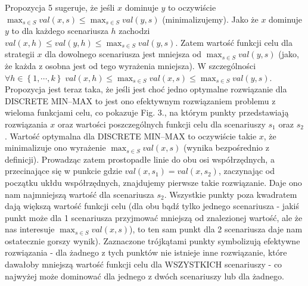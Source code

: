 Propozycja 5 sugeruje, że jeśli $x$ dominuje $y$ to oczywiście $\max_{s \in S} val \left( x, s \right) \leqslant \max_{s \in S} val \left( y, s \right)$ (minimalizujemy). Jako że $x$ dominuje $y$ to dla każdego scenariusza $h$ zachodzi $val \left( x, h \right) \leqslant val \left( y, h \right) \leqslant \max_{s \in S} val \left( y, s \right)$. Zatem wartość funkcji celu dla strategii $x$ dla dowolnego scenariusza jest mniejsza od $\max_{s \in S} val \left( y, s \right)$ (jako, że każda z osobna jest od tego wyrażenia mniejsza). W szczególności $\forall h \in \left\{ 1, \cdots, k \right\} \; val \left( x, h \right) \leqslant \max_{s \in S} val \left( x, s \right) \leqslant \max_{s \in S} val \left( y, s \right)$. Propozycja jest teraz taka, że jeśli jest choć jedno optymalne rozwiązanie dla DISCRETE MIN–MAX to jest ono efektywnym rozwiązaniem problemu z wieloma funkcjami celu, co pokazuje Fig. 3., na którym punkty przedstawiają rozwiązania $x$ oraz wartości poszczególnych funkcji celu dla scenariuszy $s_{1}$ oraz $s_{2}$. Wartość optymalna dla DISCRETE MIN–MAX to oczywiście takie $x$, że minimalizuje ono wyrażenie $\max_{s \in S} val \left( x, s \right)$ (wynika bezpośrednio z definicji). Prowadząc zatem prostopadłe linie do obu osi współrzędnych, a przecinające się w punkcie gdzie $val \left( x, s_{1} \right) = val \left( x, s_{2} \right)$, zaczynając od początku ukłdu współrzędnych, znajdujemy pierwsze takie rozwiązanie. Daje ono nam najmniejszą wartość dla scenariusza $s_{2}$. Wszystkie punkty poza kwadratem dają większą wartość funkcji celu (dla obu bądź tylko jednego scenariusza - jakiś punkt może dla 1 scenariusza przyjmować mniejszą od znalezionej wartość, ale że nas interesuje $\max_{s \in S} val \left( x, s \right)$), to ten sam punkt dla 2 scenariusza daje nam ostatecznie gorszy wynik). Zaznaczone trójkątami punkty symbolizują efektywne rozwiązania - dla żadnego z tych punktów nie istnieje inne rozwiązanie, które dawałoby mniejszą wartość funkcji celu dla WSZYSTKICH scenariuszy - co najwyżej może dominować dla jednego z dwóch scenariuszy lub dla żadnego.

